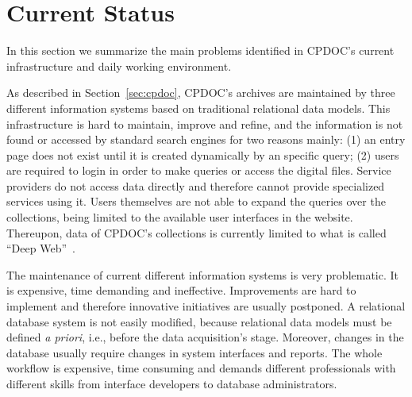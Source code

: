 
\section{Current Status}\label{sec:problems}

In this section we summarize the main problems identified in CPDOC's
current infrastructure and daily working environment.

As described in Section~\ref{sec:cpdoc}, CPDOC's archives are
maintained by three different information systems based on traditional
relational data models. This infrastructure is hard to maintain,
improve and refine, and the information is not found or accessed by
standard search engines for two reasons mainly: (1) an entry page does
not exist until it is created dynamically by an specific query; (2)
users are required to login in order to make queries or access the
digital files. Service providers do not access data directly and
therefore cannot provide specialized services using it. Users
themselves are not able to expand the queries over the collections,
being limited to the available user interfaces in the website.
Thereupon, data of CPDOC's collections is currently limited to what is
called ``Deep Web''~\cite{bergman2001white}.



The maintenance of current different information systems is very
problematic. It is expensive, time demanding and
ineffective. Improvements are hard to implement and therefore
innovative initiatives are usually postponed. A relational database
system is not easily modified, because relational data models must be
defined \emph{a priori}, i.e., before the data acquisition's
stage. Moreover, changes in the database usually require changes in
system interfaces and reports. The whole workflow is expensive, time
consuming and demands different professionals with different skills
from interface developers to database administrators.

